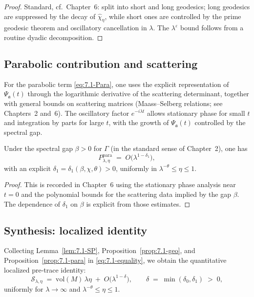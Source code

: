 \begin{proof}
Standard, cf.\ Chapter~6: split into short and long geodesics; long geodesics are suppressed by the decay of $\widehat{\chi}_\eta$, while short ones are controlled by the prime geodesic theorem and oscillatory cancellation in $\lambda$. The $\lambda^\varepsilon$ bound follows from a routine dyadic decomposition.
\end{proof}

\subsection{Parabolic contribution and scattering} \label{subsec:7.1-para}

For the parabolic term \eqref{eq:7.1-Para}, one uses the explicit representation of $\Psi_{\mathfrak{a}}(t)$ through the logarithmic derivative of the scattering determinant, together with general bounds on scattering matrices (Maass--Selberg relations; see Chapters~2 and~6). The oscillatory factor $e^{-i\lambda t}$ allows stationary phase for small $t$ and integration by parts for large $t$, with the growth of $\Psi_{\mathfrak{a}}(t)$ controlled by the spectral gap.

\begin{proposition}\label{prop:7.1-para}
Under the spectral gap $\beta>0$ for $\Gamma$ (in the standard sense of Chapter~2), one has
\[
  P_{\lambda,\eta}^{\mathrm{para}} \;=\; O\!\big(\lambda^{1-\delta_1}\big),
\]
with an explicit $\delta_1=\delta_1(\beta,\chi,\theta)>0$, uniformly in $\lambda^{-\theta}\le \eta\le 1$.
\end{proposition}

\begin{proof}
This is recorded in Chapter~6 using the stationary phase analysis near $t=0$ and the polynomial bounds for the scattering data implied by the gap $\beta$. The dependence of $\delta_1$ on $\beta$ is explicit from those estimates.
\end{proof}

\subsection{Synthesis: localized identity} \label{subsec:7.1-synthesis}

Collecting Lemma~\ref{lem:7.1-SP}, Proposition~\ref{prop:7.1-geo}, and Proposition~\ref{prop:7.1-para} in \eqref{eq:7.1-equality}, we obtain the quantitative localized pre-trace identity:
\begin{equation}\label{eq:7.1-quant}
  \mathcal{S}_{\lambda,\eta}
  \;=\; \mathrm{vol}(M)\,\lambda\eta
        \;+\; O\!\big(\lambda^{1-\delta}\big),
  \qquad
  \delta \;=\; \min(\delta_0,\delta_1)\;>\;0,
\end{equation}
uniformly for $\lambda\to\infty$ and $\lambda^{-\theta}\le \eta\le 1$.

